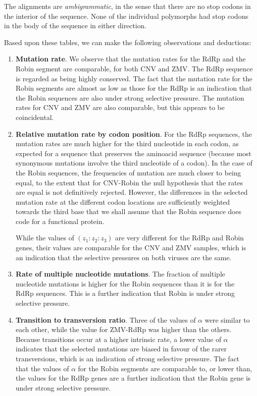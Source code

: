 \documentclass[unnumsec,webpdf,contemporary,large,namedate]{oup-authoring-template}%
\theoremstyle{thmstyleone}%
\theoremstyle{thmstyletwo}%
\theoremstyle{thmstylethree}%
\begin{document}
The alignments are \emph{ambigrammatic}, in the sense that there are no stop codons in the 
interior of the sequence. None of the individual polymorphs had stop codons in the body of the 
sequence in either direction. 

Based upon these tables, we can make the following observations and deductions:

\begin{enumerate}

\item{\bf Mutation rate}. We observe that the mutation rates for the RdRp and the Robin 
segment are comparable, for both CNV and ZMV. The RdRp sequence is regarded as 
being highly conserved. The fact that the mutation rate for the Robin segments are almost as low 
as those for the RdRp is an indication that the Robin sequences are also under strong selective pressure. 
The mutation rates for CNV and ZMV are also comparable, but this appears to be coincidental.

\item{\bf Relative mutation rate by codon position}. For the RdRp sequences, the mutation rates are much higher
for the third nucleotide in each codon, as expected for a sequence that preserves the aminoacid sequence
(because most synonymous mutations involve the third nucleotide of a codon). In the case of the Robin sequences, 
the frequencies of mutation are much closer to being equal, to the extent that for CNV-Robin the null hypothesis 
that the rates are equal is not definitively rejected. However, the differences in the selected mutation rate at the different 
codon locations are sufficiently weighted towards the third base that we shall assume that the Robin sequence 
does code for a functional protein.

While the values of $(z_1:z_2:z_3)$ are very different for the RdRp and Robin genes, their values are 
comparable for the CNV and ZMV samples, which is an indication that the selective pressures on both 
viruses are the same. 

\item{\bf Rate of multiple nucleotide mutations}. The fraction of multiple nucleotide mutations is 
higher for the Robin sequences than it is for the RdRp sequences. This is a further indication that Robin 
is under strong selective pressure.

\item{\bf Transition to transversion ratio}. Three of the values of $\alpha$ were similar to each other, while the value
for ZMV-RdRp was higher than the others. Because transitions occur at a higher intrinsic rate, a lower 
value of $\alpha$ indicates that the selected mutations are biased in favour of the rarer transversions, 
which is an indication of strong selective pressure. The fact that the values of $\alpha$ for the Robin segments are 
comparable to, or lower than, the values for the RdRp genes are a further indication that the Robin gene 
is under strong selective pressure. 


\end{enumerate}
\end{document}
